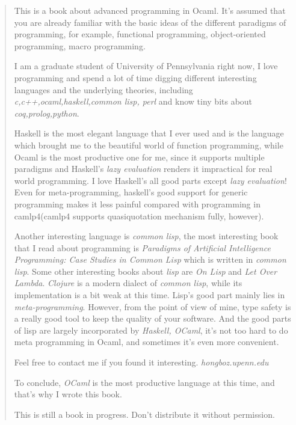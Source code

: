 \documentclass[svgnames,12pt,a4paper]{book}
\begin{document}

\setcounter{tocdepth}{4}




\begin{quotation}

  This is a book about advanced programming in Ocaml.  It's assumed
  that you are already familiar with the basic ideas of the different
  paradigms of programming, for example, functional programming,
  object-oriented programming, macro programming.

  I am a graduate student of University of Pennsylvania right now, I
  love programming and spend a lot of time digging different
  interesting languages and the underlying theories, including
  \textit{c,c++,ocaml,haskell,common lisp, perl} and know tiny bits
  about \textit{coq,prolog,python}.

  Haskell is the most elegant language that I ever used and is the
  language which brought me to the beautiful world of function
  programming, while Ocaml is the most productive one for me, since it
  supports multiple paradigms and Haskell's \textit{lazy evaluation}
  renders it impractical for real world programming. I love Haskell's
  all good parts except \textit{lazy evaluation}! Even for
  meta-programming, haskell's good support for generic programming
  makes it less painful compared with programming in camlp4(camlp4
  supports quasiquotation mechanism fully, however).

  Another interesting language is \textit{common lisp}, the most
  interesting book that I read about programming is \textit{Paradigms
    of Artificial Intelligence Programming: Case Studies in Common
    Lisp} which is written in \textit{common lisp}. Some other
  interesting books about \textit{lisp} are \textit{On Lisp} and
  \textit{Let Over Lambda}. \textit{Clojure} is a modern dialect of
  \textit{common lisp}, while its implementation is a bit weak at this
  time. Lisp's good part mainly lies in \textit{meta-programming}.
  However, from the point of view of mine, type safety is a really
  good tool to keep the quality of your software. And the good parts
  of lisp are largely incorporated by \textit{Haskell, OCaml}, it's
  not too hard to do meta programming in Ocaml, and sometimes it's
  even more convenient.

  Feel free to contact me if you found it
  interesting. \textit{hongboz\@seas.upenn.edu}
  
  To conclude, \textit{OCaml} is the most productive language at this
  time, and that's why I wrote this book.

  
  This is still a book in progress. Don't distribute it without permission.


\end{quotation}
\end{document}

